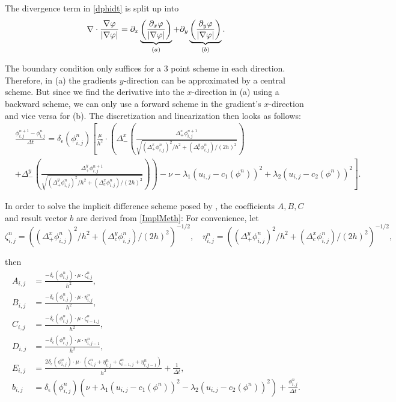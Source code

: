The divergence term in \eqref{dphidt} is split up into 
\begin{equation}
  \nabla\cdot \frac{\nabla\varphi}{\left| {\nabla\varphi} \right|} = \partial_x\underbrace{\left(\frac{\partial_x \varphi}{\left| {\nabla\varphi} \right|}\right)}_{(a)} + \partial_y\underbrace{\left(\frac{\partial_y \varphi}{\left| {\nabla\varphi} \right|}\right)}_{(b)}.
\end{equation}

The boundary condition only suffices for a 3 point scheme in each direction. Therefore, in (a) the gradients $y$-direction can be approximated by a central scheme. But since we find the derivative into the $x$-direction in (a) using a backward scheme, we can only use a forward scheme in the gradient's $x$-direction and vice versa for (b). The discretization and linearization then looks as follows:
\begin{equation}
  \begin{split}
    &\frac{\phi_{i,j}^{n+1}-\phi_{i,j}^n}{\Delta t} = \delta_\epsilon(\phi_{i,j}^n) \left[\frac{\mu}{h^2}\cdot 
\left(\Delta_-^x \left(\frac{\Delta_+^x\phi_{i,j}^{n+1}}{\sqrt{(\Delta_+^x\phi_{i,j}^n)^2/h^2 + (\Delta_c^y \phi_{i,j}^n)/(2h)^2}}\right)\right.\right.\\
    &\left.\left.+ \Delta_-^y \left(\frac{\Delta_+^y\phi_{i,j}^{n+1}}{\sqrt{(\Delta_+^y\phi_{i,j}^n)^2/h^2 + (\Delta_c ^x \phi_{i,j}^n)/(2h)^2}}\right)\right)
    - \nu - \lambda_1(u_{i,j} - c_1(\phi^n))^2 + \lambda_2(u_{i,j} - c_2(\phi^n))^2\right].
  \end{split}\label{ImplMeth}
\end{equation}

In order to solve the implicit difference scheme posed by \cite{chan.01}, the coefficients $A,B,C$ and result vector $b$ are derived from \eqref{ImplMeth}:
For convenience, let
\begin{equation}
\zeta_{i,j}^n = \left((\Delta_+^x\phi_{i,j}^n)^2/h^2 + (\Delta_c^y \phi_{i,j}^n)/(2h)^2\right)^{-1/2},\quad
\eta_{i,j}^n = \left((\Delta_+^y\phi_{i,j}^n)^2/h^2 + (\Delta_c ^x \phi_{i,j}^n)/(2h)^2\right)^{-1/2},\label{zetaeta}
\end{equation}

then
\begin{align}
A_{i,j} &= \frac{-\delta_\epsilon(\phi_{i,j}^n)\cdot\mu\cdot \zeta_{i,j}^n}{h^2},\\
B_{i,j} &= \frac{-\delta_\epsilon(\phi_{i,j}^n)\cdot\mu\cdot\eta_{i,j}^n}{h^2},\\
C_{i,j} &= \frac{-\delta_\epsilon(\phi_{i,j}^n)\cdot\mu\cdot \zeta_{i-1,j}^n}{h^2},\\
D_{i,j} &= \frac{-\delta_\epsilon(\phi_{i,j}^n)\cdot\mu\cdot\eta_{i,j-1}^n}{h^2},\\
E_{i,j} &= \frac{2\delta_\epsilon(\phi_{i,j}^n)\cdot\mu\cdot(\zeta_{i,j}^n + \eta_{i,j}^n + \zeta_{i-1,j}^n +\eta_{i,j-1}^n)}{h^2}+\frac{1}{\Delta t},\\
b_{i,j} &= \delta_\epsilon(\phi_{i,j}^n)\left(\nu + \lambda_1(u_{i,j}-c_1(\phi^n))^2 - \lambda_2(u_{i,j}-c_2(\phi^n))^2\right) + \frac{\phi_{i,j}^n}{\Delta t}.
\end{align}

